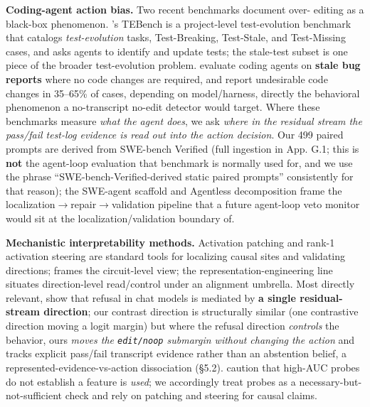 \documentclass[
  11pt,
  a4paper]{article}
\begin{document}
\textbf{Coding-agent action bias.} Two recent benchmarks document over-
editing as a black-box phenomenon. \citet{shang2026tebench}'s TEBench is
a project-level test-evolution benchmark that catalogs
\emph{test-evolution} tasks, Test-Breaking, Test-Stale, and Test-Missing
cases, and asks agents to identify and update tests; the stale-test
subset is one piece of the broader test-evolution problem.
\citet{fixedbench2025} evaluate coding agents on \textbf{stale bug
reports} where no code changes are required, and report undesirable code
changes in 35--65\% of cases, depending on model/harness, directly the
behavioral phenomenon a no-transcript no-edit detector would target.
Where these benchmarks measure \emph{what the agent does}, we ask
\emph{where in the residual stream the pass/fail test-log evidence is
read out into the action decision}. Our 499 paired prompts are derived
from SWE-bench Verified \citep{jimenez2024swebench} (full ingestion in
App. G.1; this is \textbf{not} the agent-loop evaluation that benchmark
is normally used for, and we use the phrase ``SWE-bench-Verified-derived
static paired prompts'' consistently for that reason); the SWE-agent
scaffold \citep{yang2024sweagent} and Agentless decomposition
\citep{xia2024agentless} frame the localization\ensuremath{\rightarrow}repair\ensuremath{\rightarrow}validation
pipeline that a future agent-loop veto monitor would sit at the
localization/validation boundary of.

\textbf{Mechanistic interpretability methods.} Activation patching
\citep{meng2022rome, wang2023ioi, heimersheim2024patching, zhang2024patchingbestpractices}
and rank-1 activation steering
\citep{turner2023actadd, rimsky2024caa, huang2025manifold} are standard
tools for localizing causal sites and validating directions;
\citet{elhage2021mathematical} frames the circuit-level view; the
representation-engineering line \citep{zou2023representation} situates
direction-level read/control under an alignment umbrella. Most directly
relevant, \citet{arditi2024refusal} show that refusal in chat models is
mediated by \textbf{a single residual-stream direction}; our contrast
direction is structurally similar (one contrastive direction moving a
logit margin) but where the refusal direction \emph{controls} the
behavior, ours \emph{moves the \texttt{edit/noop} submargin without
changing the action} and tracks explicit pass/fail transcript evidence
rather than an abstention belief, a represented-evidence-vs-action
dissociation (\S{}5.2). \citet{hewitt2019probes} caution that high-AUC
probes do not establish a feature is \emph{used}; we accordingly treat
probes as a necessary-but-not-sufficient check and rely on patching and
steering for causal claims.
\end{document}
